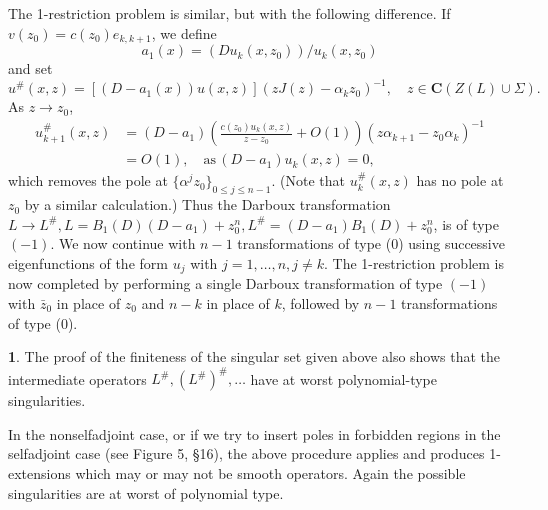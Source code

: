 \documentclass{surv-l}
\theoremstyle{plain}
\theoremstyle{definition}
\newtheorem{remark}[theorem]{\sc{Remark}}
\numberwithin{equation}{chapter}
\begin{document}
The 1-restriction problem is similar, but with the following difference. If $v(z_{0})=c(z_{0})e_{k,k+1}$, we define
\begin{equation}\label{eq37.48}
a_{1}(x)=(Du_{k}(x, z_{0}))/u_{k}(x, z_{0})
\end{equation}
and set
\begin{equation*}
u^{\#}(x, z)=[(D-a_{1}(x))u(x, z)](zJ(z)-\alpha_{k}z_{0})^{-1}, \quad z\in \mathrm{\textbf{C}}(Z(L)\cup\Sigma).
\end{equation*}
As $z\rightarrow z_{0}$,
\begin{align*}
u_{k+1}^{\#}(x, z)&=(D-a_{1})\left(\frac{c(z_{0})u_{k}(x,z)}{z-z_{0}}+O(1)\right)(z\alpha_{k+1}-z_{0}\alpha_{k})^{-1} \\
&=O(1),\quad \mathrm{as}\,(D-a_{1})u_{k}(x, z)=0,
\end{align*}
which removes the pole at $\{\alpha^{j}z_{0}\}_{0\leq j\leq n-1}$. (Note that $u_{k}^{\#}(x, z)$ has no pole at $z_{0}$ by a similar calculation.) Thus the Darboux transformation $ L\rightarrow L^{\#}, L=B_{1}(D)(D-a_{1}) + z_{0}^{n}, L^{\#}=(D-a_{1})B_{1}(D)+z_{0}^{n}$, is of type $(-1)$. We now continue with $n-1$ transformations of type (0) using successive eigenfunctions of the form $u_{j}$ with $j=1,\ldots,n, j\neq k$. The 1-restriction problem is now completed by performing a single Darboux transformation of type $(-1)$ with $\bar{z}_{0}$ in place of $z_{0}$ and $n-k$ in place of $k$, followed by $n-1$ transformations of type (0).\quad
\setcounter{theorem}{48}
\begin{remark}\label{rem37.49}
The proof of the finiteness of the singular set given above also shows that the intermediate operators $ L^{\#}, (L^{\#})^{\#},\ldots $ have at worst polynomial-type singularities.
\end{remark}

In the nonselfadjoint case, or if we try to insert poles in forbidden regions in the selfadjoint case (see Figure 5, \S 16), the above procedure applies and produces 1-extensions which may or may not be smooth operators. Again the possible singularities are at worst of polynomial type.
\end{document}
